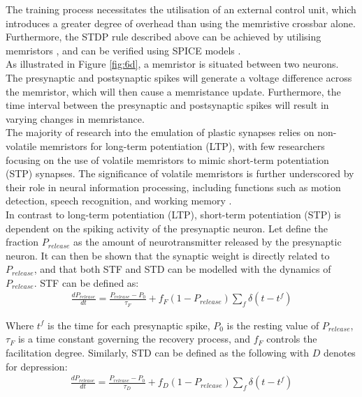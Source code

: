\noindent The training process necessitates the utilisation of an external control unit, which introduces a greater degree of overhead than using the memristive crossbar alone. Furthermore, the STDP rule described above can be achieved by utilising memristors \cite{maranhao2021low}, and can be verified using SPICE models \cite{yakopcic2013generalized}. \\

\noindent As illustrated in Figure \ref{fig:6d}, a memristor is situated between two neurons. The presynaptic and postsynaptic spikes will generate a voltage difference across the memristor, which will then cause a memristance update. Furthermore, the time interval between the presynaptic and postsynaptic spikes will result in varying changes in memristance. \\

\noindent The majority of research into the emulation of plastic synapses relies on non-volatile memristors for long-term potentiation (LTP), with few researchers focusing on the use of volatile memristors to mimic short-term potentiation (STP) synapses. The significance of volatile memristors is further underscored by their role in neural information processing, including functions such as motion detection, speech recognition, and working memory \cite{ghanbari2017estimating}. \\

\noindent In contrast to long-term potentiation (LTP), short-term potentiation (STP) is dependent on the spiking activity of the presynaptic neuron. Let define the fraction $P_{release}$ as the amount of neurotransmitter released by the presynaptic neuron. It can then be shown that the synaptic weight is directly related to $P_{release}$, and that both STF and STD can be modelled with the dynamics of $P_{release}$. STF can be defined as:
\begin{align}
\frac{dP_{release}}{dt} = \frac{P_{release} - P_0}{\tau_F} + f_F(1 - P_{release})\sum_{f}\delta\left( t- t^f \right) \label{eq:6.10}
\end{align}


\noindent Where $t^f$ is the time for each presynaptic spike, $P_0$ is the resting value of $P_{release}$, $\tau_F$ is a time constant governing the recovery process, and $f_F$ controls the facilitation degree. Similarly, STD can be defined as the following with $D$ denotes for depression:
\begin{align}
\frac{dP_{release}}{dt} = \frac{P_{release} - P_0}{\tau_D} + f_D(1 - P_{release})\sum_{f}\delta\left( t- t^f \right) \label{eq:6.11}
\end{align}


